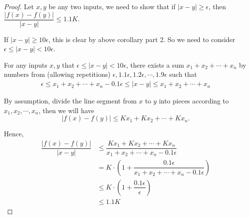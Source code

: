 \documentclass{llncs}
\begin{document}
\begin{proof}
	Let $x,y$ be any two inputs, we need to show that if $|x-y|\geq \epsilon$, then $\dfrac{|f(x)-f(y)|}{|x-y|}\leq 1.1 K$. 
	
	If $|x-y| \geq 10\epsilon$, this is clear by above corollary part 2. So we need to consider $\epsilon\leq |x-y|< 10\epsilon$.
	
	For any inputs $x,y$ that $\epsilon\leq|x-y|< 10\epsilon$, there exists a sum $x_1+x_2+\cdots+x_n$ by numbers from (allowing repetitions) $\epsilon, 1.1\epsilon, 1.2\epsilon, \cdots, 1.9\epsilon$ such that \begin{align*}
	 \epsilon \leq x_1+x_2+\cdots+x_n -0.1\epsilon \leq |x-y| \leq x_1+x_2+\cdots+x_n
	\end{align*}
	
	By assumption, divide the line segment from $x$ to $y$ into pieces according to $x_1, x_2,\cdots,x_n$, then we will have $$|f(x)-f(y)|\leq Kx_1+Kx_2+\cdots+Kx_n.$$
	
	Hence,\begin{align*}
		\dfrac{|f(x)-f(y)|}{|x-y|} &\leq \dfrac{Kx_1+Kx_2+\cdots+Kx_n}{x_1+x_2+\cdots+x_n -0.1\epsilon}\\
		& = K\cdot( 1+  \dfrac{0.1\epsilon}{x_1+x_2+\cdots+x_n -0.1\epsilon})\\
		& \leq K\cdot( 1+  \dfrac{0.1\epsilon}{\epsilon})\\
		& \leq 1.1 K
	\end{align*}
	
\end{proof}
\end{document}
